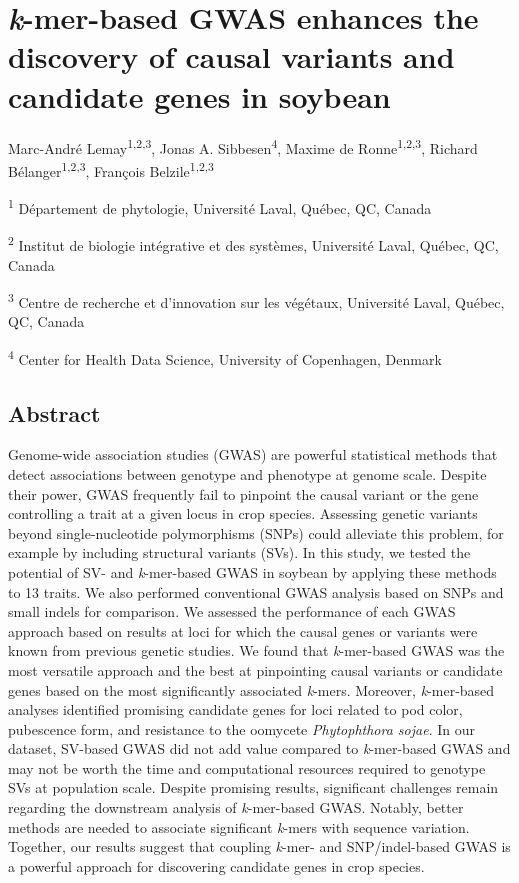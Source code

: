 \chapter*{\textit{k}-mer-based GWAS enhances the discovery of causal variants and candidate genes in soybean}
\label{kmer-gwas}

Marc-André Lemay\textsuperscript{1,2,3},
Jonas A. Sibbesen\textsuperscript{4},
Maxime de Ronne\textsuperscript{1,2,3},
Richard Bélanger\textsuperscript{1,2,3},
François Belzile\textsuperscript{1,2,3}

\textsuperscript{1} Département de phytologie, Université Laval, Québec, QC, Canada

\textsuperscript{2} Institut de biologie intégrative et des systèmes, Université Laval, Québec, QC, Canada

\textsuperscript{3} Centre de recherche et d’innovation sur les végétaux, Université Laval, Québec, QC, Canada

\textsuperscript{4} Center for Health Data Science, University of Copenhagen, Denmark

\clearpage

\section*{Abstract}

Genome-wide association studies (GWAS) are powerful statistical methods that
detect associations between genotype and phenotype at genome scale. Despite
their power, GWAS frequently fail to pinpoint the causal variant or the gene
controlling a trait at a given locus in crop species. Assessing genetic
variants beyond single-nucleotide polymorphisms (SNPs) could alleviate this
problem, for example by including structural variants (SVs).  In this study, we
tested the potential of SV- and \emph{k}-mer-based GWAS in soybean by applying
these methods to 13 traits.  We also performed conventional GWAS analysis based
on SNPs and small indels for comparison.  We assessed the performance of each
GWAS approach based on results at loci for which the causal genes or variants
were known from previous genetic studies. We found that \emph{k}-mer-based GWAS
was the most versatile approach and the best at pinpointing causal variants or
candidate genes based on the most significantly associated \emph{k}-mers.
Moreover, \textit{k}-mer-based analyses identified promising candidate genes
for loci related to pod color, pubescence form, and resistance to the oomycete
\textit{Phytophthora sojae}. In our dataset, SV-based GWAS did not add value
compared to \textit{k}-mer-based GWAS and may not be worth the time and
computational resources required to genotype SVs at population scale.  Despite
promising results, significant challenges remain regarding the downstream
analysis of \emph{k}-mer-based GWAS.  Notably, better methods are needed to
associate significant \emph{k}-mers with sequence variation. Together, our
results suggest that coupling \emph{k}-mer- and SNP/indel-based GWAS is a
powerful approach for discovering candidate genes in crop species.

